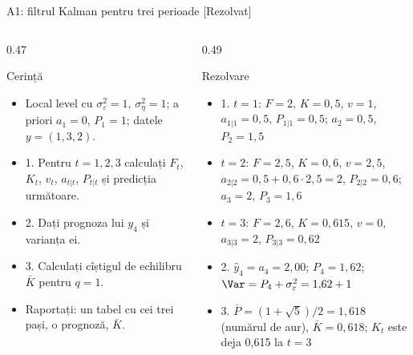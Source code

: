 \begin{frame}{A1: filtrul Kalman pentru trei perioade [Rezolvat]}
\itemsize{\scriptsize}
\begin{columns}[T]
\begin{column}{0.47\textwidth}
\begin{block}{Cerință}
\begin{itemize}
    \item Local level cu $\sigma^2_\varepsilon = 1$, $\sigma^2_\eta = 1$; a priori $a_1 = 0$, $P_1 = 1$; datele $y = (1, 3, 2)$.
    \item 1. Pentru $t = 1, 2, 3$ calculați $F_t$, $K_t$, $v_t$, $a_{t|t}$, $P_{t|t}$ și predicția următoare.
    \item 2. Dați prognoza lui $y_4$ și varianța ei.
    \item 3. Calculați cîștigul de echilibru $\bar K$ pentru $q = 1$.
    \item Raportați: un tabel cu cei trei pași, o prognoză, $\bar K$.
\end{itemize}
\end{block}
\end{column}
\begin{column}{0.49\textwidth}
\begin{exampleblock}{Rezolvare}
\begin{itemize}
    \item 1. $t = 1$: $F = 2$, $K = 0{,}5$, $v = 1$, $a_{1|1} = 0{,}5$, $P_{1|1} = 0{,}5$; $a_2 = 0{,}5$, $P_2 = 1{,}5$
    \item $t = 2$: $F = 2{,}5$, $K = 0{,}6$, $v = 2{,}5$, $a_{2|2} = 0{,}5 + 0{,}6 \cdot 2{,}5 = 2$, $P_{2|2} = 0{,}6$; $a_3 = 2$, $P_3 = 1{,}6$
    \item $t = 3$: $F = 2{,}6$, $K = 0{,}615$, $v = 0$, $a_{3|3} = 2$, $P_{3|3} = 0{,}62$
    \item 2. $\hat y_4 = a_4 = 2{,}00$; $P_4 = 1{,}62$; $\Var = P_4 + \sigma^2_\varepsilon = 1{,}62 + 1$
    \item 3. $\bar P = (1 + \sqrt5)/2 = 1{,}618$ (numărul de aur), $\bar K = 0{,}618$; $K_t$ este deja 0{,}615 la $t = 3$
\end{itemize}
\end{exampleblock}
\end{column}
\end{columns}
\end{frame}

